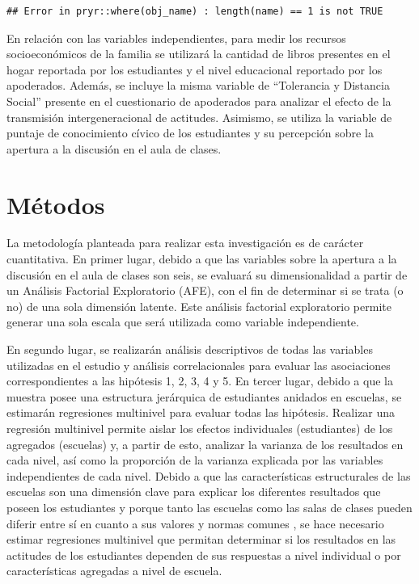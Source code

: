 \documentclass[12pt,twoside]{templates/facsothesis}
\begin{document}
\begin{verbatim}
## Error in pryr::where(obj_name) : length(name) == 1 is not TRUE
\end{verbatim}

En relación con las variables independientes, para medir los recursos socioeconómicos de la familia se utilizará la cantidad de libros presentes en el hogar reportada por los estudiantes y el nivel educacional reportado por los apoderados. Además, se incluye la misma variable de ``Tolerancia y Distancia Social'' presente en el cuestionario de apoderados para analizar el efecto de la transmisión intergeneracional de actitudes. Asimismo, se utiliza la variable de puntaje de conocimiento cívico de los estudiantes y su percepción sobre la apertura a la discusión en el aula de clases.

\hypertarget{muxe9todos}{%
\section{Métodos}\label{muxe9todos}}

La metodología planteada para realizar esta investigación es de carácter cuantitativa. En primer lugar, debido a que las variables sobre la apertura a la discusión en el aula de clases son seis, se evaluará su dimensionalidad a partir de un Análisis Factorial Exploratorio (AFE), con el fin de determinar si se trata (o no) de una sola dimensión latente. Este análisis factorial exploratorio permite generar una sola escala que será utilizada como variable independiente.

En segundo lugar, se realizarán análisis descriptivos de todas las variables utilizadas en el estudio y análisis correlacionales para evaluar las asociaciones correspondientes a las hipótesis 1, 2, 3, 4 y 5. En tercer lugar, debido a que la muestra posee una estructura jerárquica de estudiantes anidados en escuelas, se estimarán regresiones multinivel para evaluar todas las hipótesis. Realizar una regresión multinivel permite aislar los efectos individuales (estudiantes) de los agregados (escuelas) y, a partir de esto, analizar la varianza de los resultados en cada nivel, así como la proporción de la varianza explicada por las variables independientes de cada nivel. Debido a que las características estructurales de las escuelas son una dimensión clave para explicar los diferentes resultados que poseen los estudiantes \citep{trevino_Influence_2018} y porque tanto las escuelas como las salas de clases pueden diferir entre sí en cuanto a sus valores y normas comunes \citep{bayramozdemir_How_2020}, se hace necesario estimar regresiones multinivel que permitan determinar si los resultados en las actitudes de los estudiantes dependen de sus respuestas a nivel individual o por características agregadas a nivel de escuela.
\end{document}
